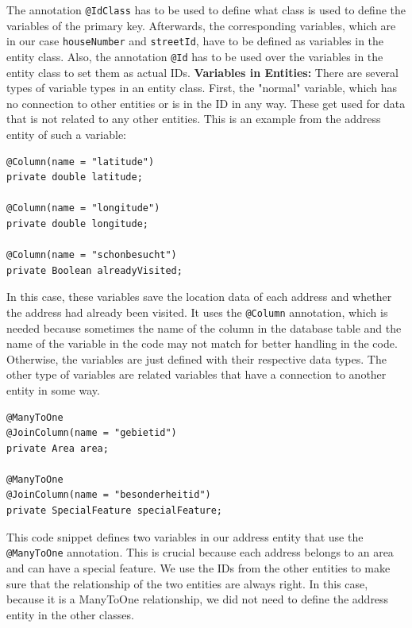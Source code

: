     The annotation \texttt{@IdClass} has to be used to define what class is used to define the variables of the primary key. Afterwards, the corresponding variables, which are in our case \texttt{houseNumber} and \texttt{streetId}, have to be defined as variables in the entity class. Also, the annotation \texttt{@Id} has to be used over the variables in the entity class to set them as actual IDs. \newline 
    \textbf{Variables in Entities:} \newline \newline
    There are several types of variable types in an entity class. First, the "normal" variable, which has no connection to other entities or is in the ID in any way. These get used for data that is not related to any other entities. This is an example from the address entity of such a variable:
    \begin{verbatim}
@Column(name = "latitude")
private double latitude;
    
@Column(name = "longitude")
private double longitude;
    
@Column(name = "schonbesucht")
private Boolean alreadyVisited;                     
    \end{verbatim} 

    In this case, these variables save the location data of each address and whether the address had already been visited. It uses the \texttt{@Column} annotation, which is needed because sometimes the name of the column in the database table and the name of the variable in the code may not match for better handling in the code. Otherwise, the variables are just defined with their respective data types. \newline
    The other type of variables are related variables that have a connection to another entity in some way.
    \begin{verbatim}
@ManyToOne
@JoinColumn(name = "gebietid")
private Area area;
    
@ManyToOne
@JoinColumn(name = "besonderheitid")
private SpecialFeature specialFeature;                    
    \end{verbatim} 

    This code snippet defines two variables in our address entity that use the \texttt{@ManyToOne} annotation. This is crucial because each address belongs to an area and can have a special feature. We use the IDs from the other entities to make sure that the relationship of the two entities are always right. In this case, because it is a ManyToOne relationship, we did not need to define the address entity in the other classes. \newline

